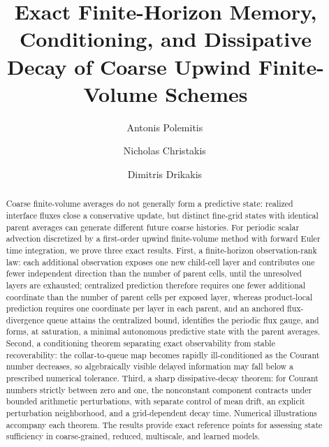 \documentclass[preprint,12pt]{elsarticle}
\theoremstyle{plain}
\theoremstyle{remark}
\theoremstyle{definition}
\begin{document}
\begin{frontmatter}

\title{Exact Finite-Horizon Memory, Conditioning, and Dissipative Decay of Coarse Upwind Finite-Volume Schemes}

\author[evolve]{Antonis Polemitis\,}

\author[iams]{Nicholas Christakis\,}

\author[iams]{Dimitris Drikakis\,}



\begin{abstract}
Coarse finite-volume averages do not generally form a predictive state: realized interface fluxes close a conservative update, but distinct fine-grid states with identical parent averages can generate different future coarse histories. For periodic scalar advection discretized by a first-order upwind finite-volume method with forward Euler time integration, we prove three exact results. First, a finite-horizon observation-rank law: each additional observation exposes one new child-cell layer and contributes one fewer independent direction than the number of parent cells, until the unresolved layers are exhausted; centralized prediction therefore requires one fewer additional coordinate than the number of parent cells per exposed layer, whereas product-local prediction requires one coordinate per layer in each parent, and an anchored flux-divergence queue attains the centralized bound, identifies the periodic flux gauge, and forms, at saturation, a minimal autonomous predictive state with the parent averages. Second, a conditioning theorem separating exact observability from stable recoverability: the collar-to-queue map becomes rapidly ill-conditioned as the Courant number decreases, so algebraically visible delayed information may fall below a prescribed numerical tolerance. Third, a sharp dissipative-decay theorem: for Courant numbers strictly between zero and one, the nonconstant component contracts under bounded arithmetic perturbations, with separate control of mean drift, an explicit perturbation neighborhood, and a grid-dependent decay time. Numerical illustrations accompany each theorem. The results provide exact reference points for assessing state sufficiency in coarse-grained, reduced, multiscale, and learned models.
\end{abstract}


\end{frontmatter}
\end{document}
